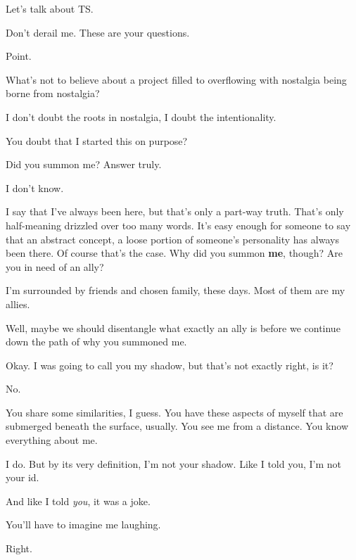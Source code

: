 \begin{paracol}{2}
\begin{leftcolumn}
\begin{ally}
Let's talk about TS.
\end{ally}
Don't derail me. These are your questions.

\begin{ally}
Point.
\end{ally}
What's not to believe about a project filled to overflowing with nostalgia being borne from nostalgia?

\begin{ally}
I don't doubt the roots in nostalgia, I doubt the intentionality.
\end{ally}
You doubt that I started this on purpose?

\begin{ally}
Did you summon me? Answer truly.
\end{ally}
I don't know.

\begin{ally}
I say that I've always been here, but that's only a part-way truth. That's only half-meaning drizzled over too many words. It's easy enough for someone to say that an abstract concept, a loose portion of someone's personality has always been there. Of course that's the case. Why did you summon \textbf{me}, though? Are you in need of an ally?
\end{ally}
I'm surrounded by friends and chosen family, these days. Most of them are my allies.

\begin{ally}
Well, maybe we should disentangle what exactly an ally is before we continue down the path of why you summoned me.
\end{ally}
Okay. I was going to call you my shadow, but that's not exactly right, is it?

\begin{ally}
No.
\end{ally}
You share some similarities, I guess. You have these aspects of myself that are submerged beneath the surface, usually. You see me from a distance. You know everything about me.

\begin{ally}
I do. But by its very definition, I'm not your shadow. Like I told you, I'm not your id.
\end{ally}
And like I told \emph{you}, it was a joke.

\begin{ally}
You'll have to imagine me laughing.
\end{ally}
Right.


\end{leftcolumn}
\end{paracol}
